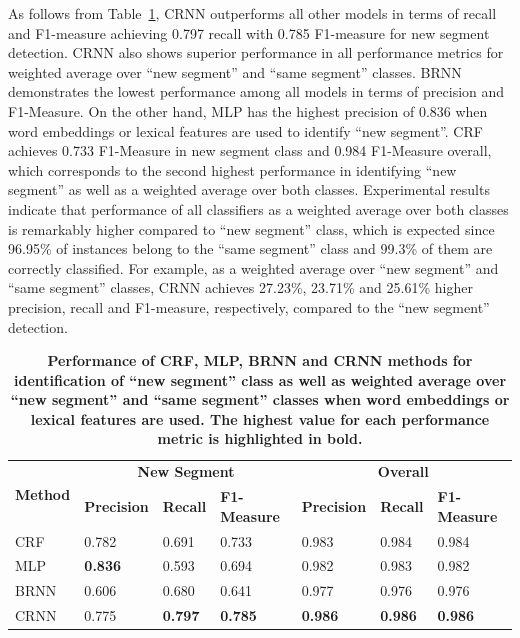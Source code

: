 \documentclass{amia}
\begin{document}
As follows from Table~\ref{tab:result_base}, CRNN outperforms all other models in terms of recall and F1-measure achieving 0.797 recall with 0.785 F1-measure for new segment detection. CRNN also shows superior performance in all performance metrics for weighted average over ``new segment'' and ``same segment'' classes. BRNN demonstrates the lowest performance among all models in terms of precision and F1-Measure. On the other hand, MLP has the highest precision of 0.836 when word embeddings or lexical features are used to identify ``new segment''. CRF achieves 0.733 F1-Measure in new segment class and 0.984 F1-Measure overall, which corresponds to the second highest performance in identifying ``new segment'' as well as a weighted average over both classes. Experimental results indicate that performance of all classifiers as a weighted average over both classes is remarkably higher compared to ``new segment'' class, which is expected since 96.95\% of instances belong to the ``same segment'' class and 99.3\% of them are correctly classified. For example, as a weighted average over ``new segment'' and ``same segment'' classes, CRNN achieves 27.23\%, 23.71\% and 25.61\% higher precision, recall and F1-measure, respectively, compared to the ``new segment'' detection. 

\begin{table}[ht]
\centering
\caption{\textbf{Performance of CRF, MLP, BRNN and CRNN methods for identification of ``new segment'' class as well as weighted average over ``new segment'' and ``same segment'' classes when word embeddings or lexical features are used. The highest value for each performance metric is highlighted in bold.}}
\label{tab:result_base}
  \begin{tabular}{|l|l|l|l|l|l|l|}
  \hline
   \multirow{2}{*}{\textbf{Method}} & \multicolumn{3}{|c|}{\textbf{New Segment}} & \multicolumn{3}{|c|}{\textbf{Overall}} \\\cline{2-7}
   & \textbf{Precision}  & \textbf{Recall} & \textbf{F1-Measure} & \textbf{Precision}  & \textbf{Recall} & \textbf{F1-Measure} \\ \hline    
 CRF & 0.782 & 0.691 & 0.733 & 0.983 & 0.984 & 0.984 \\ \hline
 MLP & \textbf{0.836} & 0.593 & 0.694 & 0.982 & 0.983 & 0.982 \\ \hline
 BRNN & 0.606 & 0.680 & 0.641 & 0.977 & 0.976 & 0.976 \\ \hline
 CRNN & 0.775 & \textbf{0.797} & \textbf{0.785} & \textbf{0.986} & \textbf{0.986} & \textbf{0.986} \\ \hline
  \end{tabular}
\end{table}                              
\end{document}

